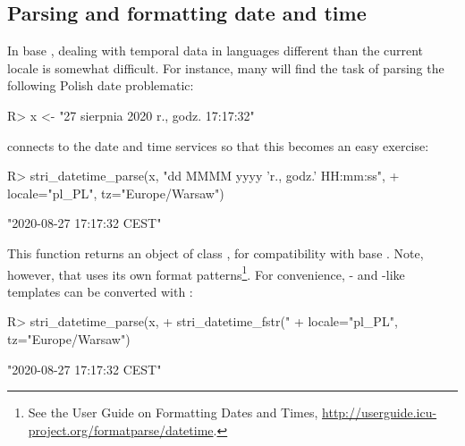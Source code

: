 \documentclass[nojss]{jss}\usepackage[]{graphicx}\usepackage[]{color}
\begin{document}







\subsection{Parsing and formatting date and time}\label{Sec:datetime}

In base , dealing with temporal data in languages
different than the current locale is somewhat difficult.
For instance, many will find the task of parsing the following Polish date problematic:

\begin{Schunk}
\begin{Sinput}
R> x <- "27 sierpnia 2020 r., godz. 17:17:32"
\end{Sinput}
\end{Schunk}

 connects to the  date and time
services  so that this becomes an easy exercise:


\begin{Schunk}
\begin{Sinput}
R> stri_datetime_parse(x, "dd MMMM yyyy 'r., godz.' HH:mm:ss",
+    locale="pl_PL", tz="Europe/Warsaw")
\end{Sinput}
\begin{Soutput}
[1] "2020-08-27 17:17:32 CEST"
\end{Soutput}
\end{Schunk}

This function returns an object of class ,
for compatibility with base .
Note, however, that
 uses its own format patterns\footnote{
See the  User Guide on {Formatting Dates and Times},
\url{http://userguide.icu-project.org/formatparse/datetime}.
}. For convenience,
- and -like
templates can be converted with :

\begin{Schunk}
\begin{Sinput}
R> stri_datetime_parse(x,
+    stri_datetime_fstr("%d %B %Y r., godz. %H:%M:%S"),
+    locale="pl_PL", tz="Europe/Warsaw")
\end{Sinput}
\begin{Soutput}
[1] "2020-08-27 17:17:32 CEST"
\end{Soutput}
\end{Schunk}
\end{document}
